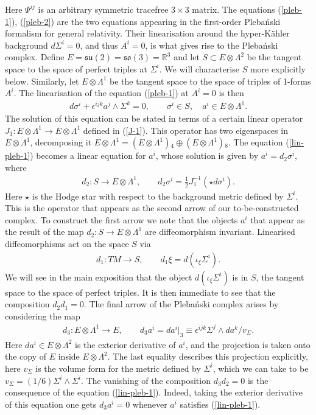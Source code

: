 \documentclass[10pt]{report}
\newcommand{\pleb}[0]{Pleba\'nski}
\theoremstyle{definition}
\newcommand{\R}[0]{\mathbb{R}}
\begin{document}
Here $\Psi^{ij}$ is an arbitrary symmetric tracefree $3\times 3$ matrix. The equations (\ref{pleb-1}), (\ref{pleb-2}) are the two equations appearing in the first-order \pleb{} formalism for general relativity. Their linearisation around the hyper-K\"ahler background $d\Sigma^i=0$, and thus $A^i=0$, is what gives rise to the \pleb{} complex. Define $E=\mathfrak{su}(2) = \mathfrak{so}(3)=\R^3$ and let $S\subset E\otimes \Lambda^2$ be the tangent space to the space of perfect triples at $\Sigma^i$. We will characterise $S$ more explicitly below. Similarly, let $E \otimes \Lambda^1$ be the tangent space to the space of triples of 1-forms $A^i$. The linearisation of the equation (\ref{pleb-1}) at $A^i=0$ is then
\begin{align}\label{lin-pleb-1}
d \sigma^i + \epsilon^{ijk} a^j \wedge \Sigma^k=0, \qquad \sigma^i\in S, \quad a^i \in E\otimes \Lambda^1.
\end{align}
The solution of this equation can be stated in terms of a certain linear operator $J_1: E\otimes \Lambda^1 \to E\otimes \Lambda^1$ defined in (\ref{J-1}). This operator has two eigenspaces in $E\otimes \Lambda^1$, decomposing it $E\otimes \Lambda^1 = (E\otimes \Lambda^1){}_4 \oplus (E\otimes \Lambda^1){}_8$. The equation (\ref{lin-pleb-1}) becomes a linear equation for $a^i$, whose solution is given by $a^i = d_2 \sigma^i$, where 
\begin{align}\label{map-2}
    d_2:S\to E\otimes \Lambda^1, \qquad d_2 \sigma^i = \frac{1}{2} J_1^{-1}( \star d \sigma^i).
\end{align}
Here $\star$ is the Hodge star with respect to the background metric defined by $\Sigma^i$. This is the operator that appears as the second arrow of our to-be-constructed complex. To construct the first arrow we note that the objects $a^i$ that appear as the result of the map $d_2: S\to E\otimes \Lambda^1$ are diffeomorphism invariant. Linearised diffeomorphisms act on the space $S$ via
\begin{align}\label{map-1}
    d_1: TM \to S, \qquad d_1 \xi = d (\iota_\xi  \Sigma^i).
\end{align}
We will see in the main exposition that the object $d (\iota_\xi  \Sigma^i)$ is in $S$, the tangent space to the space of perfect triples. It is then immediate to see that the composition $d_2 d_1=0$. The final arrow of the \pleb{} complex arises by considering the map 
\begin{align}\label{map-3}
    d_3: E\otimes \Lambda^1 \to E, \qquad d_3 a^i = da^i \Big|_3 \equiv \epsilon^{ijk} \Sigma^j \wedge da^k / v_\Sigma.
\end{align}
Here $da^i\in E\otimes \Lambda^2$ is the exterior derivative of $a^i$, and the projection is taken onto the copy of $E$ inside $E\otimes \Lambda^2$. The last equality describes this projection explicitly, here $v_\Sigma$ is the volume form for the metric defined by $\Sigma^i$, which we can take to be $v_\Sigma = (1/6) \Sigma^i\wedge \Sigma^i$. The vanishing of the composition $d_3 d_2=0$ is the consequence of the equation (\ref{lin-pleb-1}). Indeed, taking the exterior derivative of this equation one gets $d_3 a^i=0$ whenever $a^i$ satisfies (\ref{lin-pleb-1}). 
\end{document}
